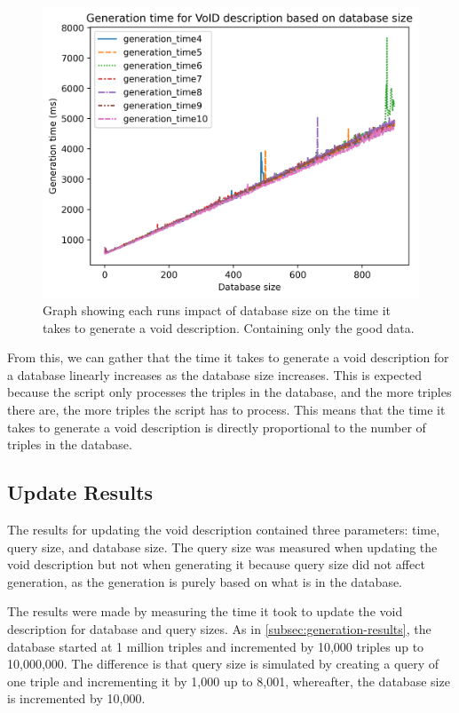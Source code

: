 \begin{figure}[htb!]
    \centering
    \includegraphics[width=0.8\columnwidth]{figures/generation-results-graph-all-good.png}
    \caption{Graph showing each runs impact of database size on the time it takes to generate a \gls{void} description. Containing only the good data.}
    \label{fig:generate-dbsize-10-runs-good}
\end{figure}

From this, we can gather that the time it takes to generate a \gls{void} description for a database linearly increases as the database size increases. This is expected because the script only processes the triples in the database, and the more triples there are, the more triples the script has to process. This means that the time it takes to generate a \gls{void} description is directly proportional to the number of triples in the database.

\subsection{Update Results}\label{subsec:update-results}
The results for updating the \gls{void} description contained three parameters: time, query size, and database size. The query size was measured when updating the \gls{void} description but not when generating it because query size did not affect generation, as the generation is purely based on what is in the database.

The results were made by measuring the time it took to update the \gls{void} description for database and query sizes. As in \autoref{subsec:generation-results}, the database started at 1 million triples and incremented by 10,000 triples up to 10,000,000. The difference is that query size is simulated by creating a query of one triple and incrementing it by 1,000 up to 8,001, whereafter, the database size is incremented by 10,000.

